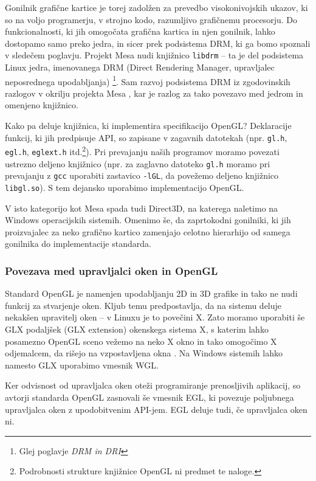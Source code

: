 \documentclass{article}
\begin{document}
Gonilnik grafične kartice je torej zadolžen za prevedbo visokonivojskih ukazov, ki so na voljo programerju, v strojno kodo, razumljivo grafičnemu procesorju. Do funkcionalnosti, ki jih omogočata grafična kartica in njen gonilnik, lahko dostopamo samo preko jedra, in sicer prek podsistema DRM, ki ga bomo spoznali v sledečem poglavju. Projekt Mesa nudi knjižnico \texttt{libdrm} -- ta je del podsistema Linux jedra, imenovanega DRM (Direct Rendering Manager, upravljalec neposrednega upodabljanja) \footnote{Glej poglavje \textit{DRM in DRI}}. Sam razvoj podsistema DRM iz zgodovinskih razlogov v okrilju projekta Mesa \autocite{drm}, kar je razlog za tako povezavo med jedrom in omenjeno knjižnico.

Kako pa deluje knjižnica, ki implementira specifikacijo OpenGL? Deklaracije funkcij, ki jih predpisuje API, so zapisane v zagavnih datotekah (npr. \texttt{gl.h}, \texttt{egl.h}, \texttt{eglext.h} itd.\footnote{Podrobnosti strukture knjižnice OpenGL ni predmet te naloge.}). Pri prevajanju naših programov moramo povezati ustrezno deljeno knjižnico (npr. za zaglavno datoteko \texttt{gl.h} moramo pri prevajanju z \texttt{gcc} uporabiti zastavico \texttt{-lGL}, da povežemo deljeno knjižnico \texttt{libgl.so}). S tem dejansko uporabimo implementacijo OpenGL.

V isto kategorijo kot Mesa spada tudi Direct3D, na katerega naletimo na Windows operacijskih sistemih. Omenimo še, da zaprtokodni gonilniki, ki jih proizvajalec za neko grafično kartico zamenjajo celotno hierarhijo od samega gonilnika do implementacije standarda.

\subsubsection{Povezava med upravljalci oken in OpenGL}
Standard OpenGL je namenjen upodabljanju 2D in 3D grafike in tako ne nudi funkcij za stvarjenje oken. Kljub temu predpostavlja, da na sistemu deluje nekakšen upravitelj oken -- v Linuxu je to povečini X. Zato moramo uporabiti še GLX podaljšek (GLX extension) okenskega sistema X, s katerim lahko posamezno OpenGL sceno vežemo na neko X okno in tako omogočimo X odjemalcem, da rišejo na vzpostavljena okna \autocite{glxwiki}. Na Windows sistemih lahko namesto GLX uporabimo vmesnik WGL.

Ker odvisnost od upravljalca oken oteži programiranje prenosljivih aplikacij, so avtorji standarda OpenGL zasnovali še vmesnik EGL, ki povezuje poljubnega upravljalca oken z upodobitvenim API-jem. EGL deluje tudi, če upravljalca oken ni.
\end{document}
